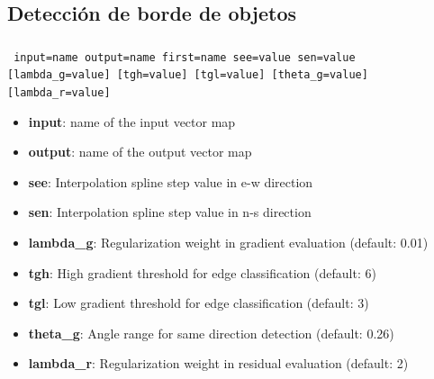 \subsection{Detección de borde de objetos}
\begin{frame}[shrink=02]
 \frametitle{}
\begin{beamerboxesrounded}[shadow=true]{\textbf{}\texttt{ input=name output=name first=name see=value sen=value [lambda\_g=value] [tgh=value] [tgl=value] [theta\_g=value] [lambda\_r=value]}}
\begin{itemize}
 \item \textbf{input}: name of the input vector map
 \item \textbf{output}: name of the output vector map
 \item \textbf{see}: Interpolation spline step value in e-w direction
 \item \textbf{sen}: Interpolation spline step value in n-s direction
 \item \textbf{lambda\_g}: Regularization weight in gradient evaluation (default: 0.01)
 \item \textbf{tgh}: High gradient threshold for edge classification (default: 6)
 \item \textbf{tgl}: Low gradient threshold for edge classification (default: 3)
 \item \textbf{theta\_g}: Angle range for same direction detection (default: 0.26)
 \item \textbf{lambda\_r}: Regularization weight in residual evaluation (default: 2)
\end{itemize}
\end{beamerboxesrounded}
\vedge
\end{frame}
\pgfdeclareimage[width=0.55\textwidth]{edge}{images/edge}
